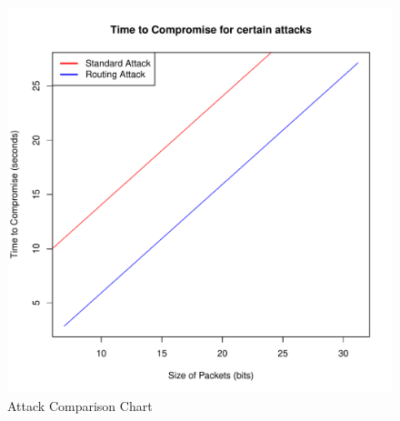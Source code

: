 \begin{figure}[H]
\caption{Attack Comparison Chart}
\includegraphics[width=\linewidth]{Figures/pktszndtmtocmp1.pdf}
\end{figure}
	
